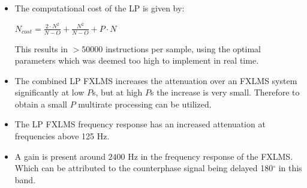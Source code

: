 \large
\begin{itemize}
\item The computational cost of the LP is given by:
\vspace{-2mm}
\begin{center}
{\large
$N_{cost}=\frac{2 \cdot N^2}{N-O}+\frac{N^2}{N-O}+P \cdot N$
}
\end{center}

	  This results in $>50000$ instructions per sample, using the optimal parameters which was deemed too high to implement in real time. \\
\item The combined LP FXLMS increases the attenuation over an FXLMS system significantly at low $P$s, but at high $P$s the increase is very small. 
	  Therefore to obtain a small $P$ multirate processing can be utilized. \\ 
\item The LP FXLMS frequency response has an increased attenuation at frequencies above 125 Hz. \\
\item A gain is present around $2400$ Hz in the frequency response of the FXLMS. Which can be attributed to the counterphase signal being delayed 180$^{\circ}$ in this band.

\end{itemize}

